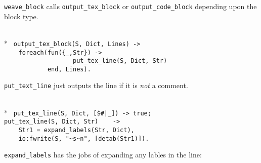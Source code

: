   \verb+weave_block+ calls \verb+output_tex_block+ or
\verb+output_code_block+ depending upon the block type.

\begin{flushleft}
\label{eweave_3_14}
\\*
\tt
\noindent{}%
\verb&output_tex_block(S, Dict, Lines) ->&\\
\noindent{}%
\verb&    foreach(fun({_,Str}) -> &\\
\noindent{}%
\verb&                   put_tex_line(S, Dict, Str) &\\
\noindent{}%
\verb&            end, Lines).&\\
\end{flushleft}

    \verb+put_text_line+ just outputs the line  if it is {\sl not\/} a
comment.

\begin{flushleft}
\label{eweave_4_14}
\\*
\tt
\noindent{}%
\verb&put_tex_line(S, Dict, [$#|_]) -> true;&\\
\noindent{}%
\verb&put_tex_line(S, Dict, Str)    -> &\\
\noindent{}%
\verb&    Str1 = expand_labels(Str, Dict),&\\
\noindent{}%
\verb&    io:fwrite(S, "~s~n", [detab(Str1)]).&\\
\end{flushleft}

\verb+expand_labels+ has the jobs of expanding any lables in the
line:

